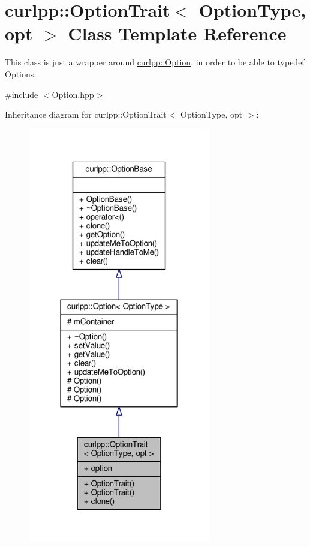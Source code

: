 \hypertarget{classcurlpp_1_1OptionTrait}{\section{curlpp\-:\-:Option\-Trait$<$ Option\-Type, opt $>$ Class Template Reference}
\label{classcurlpp_1_1OptionTrait}
}


This class is just a wrapper around \hyperlink{classcurlpp_1_1Option}{curlpp\-::\-Option}, in order to be able to typedef Options.  




{\ttfamily \#include $<$Option.\-hpp$>$}



Inheritance diagram for curlpp\-:\-:Option\-Trait$<$ Option\-Type, opt $>$\-:\nopagebreak
\begin{figure}[H]
\begin{center}
\leavevmode
\includegraphics[width=226pt]{classcurlpp_1_1OptionTrait__inherit__graph}
\end{center}
\end{figure}


